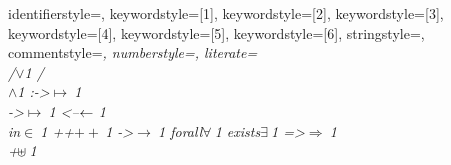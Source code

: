 {%
identifierstyle={\color{black}},
keywordstyle=[1]{\bfseries},
keywordstyle=[2]{\bfseries},
keywordstyle=[3]{\bfseries},
keywordstyle=[4]{\bfseries},
keywordstyle=[5]{\bfseries},
keywordstyle=[6]{\bfseries},
stringstyle=,
commentstyle=\it\ttfamily,
numberstyle=\tiny,
literate={\\/}{{$\vee$}}1
         {/\\}{{$\wedge$}}1
         {:->}{{$\mapsto~$\!}}1
         {\\->}{{$\mapsto~$\!}}1
         {<--}{{$\leftarrow~$}}1
         {\\in}{{$\in~$}}1
         {++}{{$+\!+\!~$}}1
         {->}{{$\to~$}}1
         {forall}{{$\forall~$}}1
         {exists}{{$\exists~$}}1
         {=>}{{$\Rightarrow~$}}1
         {\\+}{{$\!\uplus\!~$}}1
}

